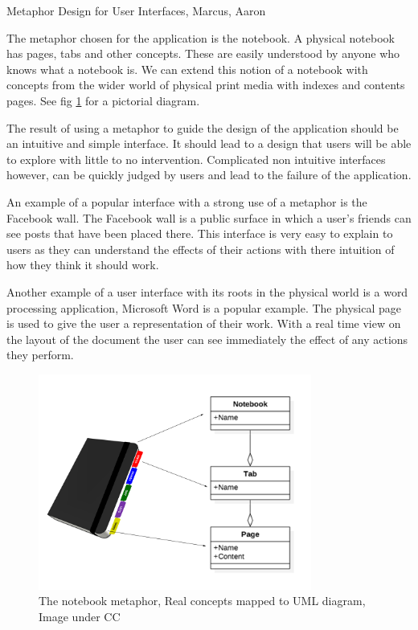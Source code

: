 Metaphor Design for User Interfaces, Marcus, Aaron\cite{Marcus:1998:MDU:286498.286577}

The metaphor chosen for the application is the notebook. A physical
notebook has pages, tabs and other concepts. These are easily understood by
anyone who knows what a notebook is. We can extend this notion of a
notebook with concepts from the wider world of physical print media with indexes and
contents pages. See fig \ref{fig:notebookmetaphor} for a pictorial diagram.

The result of using a metaphor to guide the design of the application should be
an intuitive and simple interface. It should lead to a design that users will be able to
explore with little to no intervention. Complicated non intuitive interfaces however, 
can be quickly judged by users and lead to the failure of the application.

An example of a popular interface with a strong use of a metaphor is the 
Facebook wall. The Facebook wall is a public surface in which a user's friends 
can see posts that have been placed there. This interface is very easy to explain
to users as they can understand the effects of their actions with there intuition
of how they think it should work.

Another example of a user interface with its roots in the physical world is a
word processing application, Microsoft Word is a popular example. The physical page
is used to give the user a representation of their work. With a real time view
on the layout of the document the user can see immediately the effect of any 
actions they perform.



\begin{figure}
  \includegraphics[width=0.8\textwidth]{Figures/NotebookMetaphor.png}
  \caption{The notebook metaphor, Real concepts mapped to UML diagram, Image under CC}
  \label{fig:notebookmetaphor}
\end{figure}


